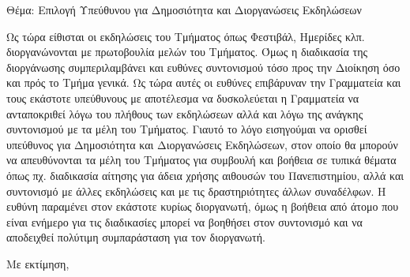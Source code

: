 \noindent
Θέμα: Επιλογή Υπεύθυνου για Δημοσιότητα και Διοργανώσεις Εκδηλώσεων

Ως τώρα είθισται οι εκδηλώσεις του Τμήματος όπως Φεστιβάλ, Ημερίδες κλπ. διοργανώνονται με πρωτοβουλία μελών του Τμήματος.  Όμως η διαδικασία της διοργάνωσης συμπεριλαμβάνει και ευθύνες συντονισμού τόσο προς την Διοίκηση όσο και πρός το Τμήμα γενικά.  Ως τώρα αυτές οι ευθύνες επιβάρυναν την Γραμματεία και τους εκάστοτε υπεύθυνους με αποτέλεσμα να δυσκολεύεται η Γραμματεία να ανταποκριθεί λόγω του πλήθους των εκδηλώσεων αλλά και λόγω της ανάγκης συντονισμού με τα μέλη του Τμήματος.  Γιαυτό το λόγο εισηγούμαι να ορισθεί υπεύθυνος για Δημοσιότητα και Διοργανώσεις Εκδηλώσεων, στον οποίο θα μπορούν να απευθύνονται τα μέλη του Τμήματος για συμβουλή και βοήθεια σε τυπικά θέματα όπως πχ. διαδικασία αίτησης για άδεια χρήσης αιθουσών του Πανεπιστημίου, αλλά και συντονισμό με άλλες εκδηλώσεις και με τις δραστηριότητες άλλων συναδέλφων.  Η ευθύνη παραμένει στον εκάστοτε κυρίως διοργανωτή, όμως η βοήθεια από άτομο που είναι ενήμερο για τις διαδικασίες μπορεί να βοηθήσει στον συντονισμό και να αποδειχθεί πολύτιμη συμπαράσταση για τον διοργανωτή.

Με εκτίμηση,
